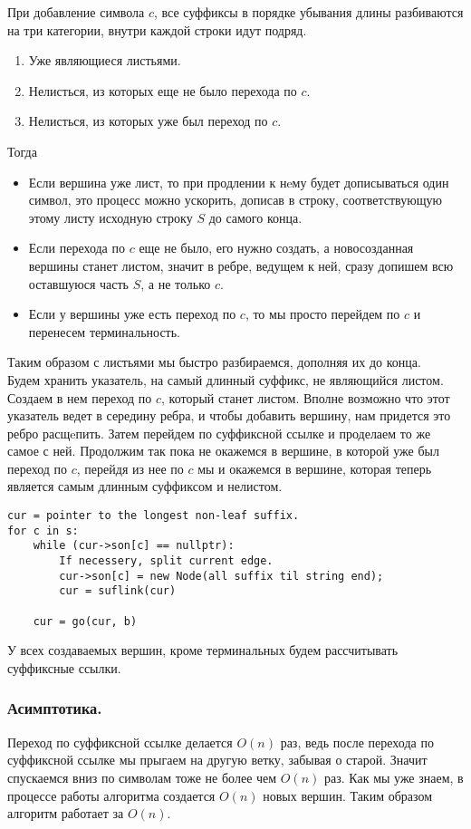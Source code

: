 При добавление символа $c$, все суффиксы в порядке убывания длины разбиваются на три категории, внутри каждой строки идут подряд. 
\begin{enumerate}
    \item Уже являющиеся листьями.
    \item Нелисться, из которых еще не было перехода по $c$.
    \item Нелисться, из которых уже был переход по $c$.
\end{enumerate}

Тогда 
\begin{itemize}
    \item Если вершина уже лист, то при продлении к нeму будет дописываться один символ, это процесс можно ускорить, дописав в строку, соответствующую этому листу исходную строку $S$ до самого конца. 
    \item Если перехода по $c$ еще не было, его нужно создать, а новосозданная вершины станет листом, значит в ребре, ведущем к ней, сразу допишем всю оставшуюся часть  $S$, а не только  $c$.
    \item Если у вершины уже есть переход по $c$, то мы просто перейдем по  $c$ и перенесем терминальность.
\end{itemize}

Таким образом с листьями мы быстро разбираемся, дополняя их до конца. \\
Будем хранить указатель, на самый длинный суффикс, не являющийся листом. Создаем в нем переход по $c$, который станет листом. Вполне возможно что этот указатель ведет в середину ребра, и чтобы добавить вершину, нам придется это ребро расщeпить. Затем перейдем по суффиксной ссылке и проделаем то же самое с ней. Продолжим так пока не окажемся в вершине, в которой уже был переход по $c$, перейдя из нее по $c$ мы и окажемся в вершине, которая теперь является самым длинным суффиксом и нелистом.

\begin{lstlisting}
cur = pointer to the longest non-leaf suffix.
for c in s:
    while (cur->son[c] == nullptr):
        If necessery, split current edge.
        cur->son[c] = new Node(all suffix til string end);
        cur = suflink(cur)

    cur = go(cur, b)
\end{lstlisting}

У всех создаваемых вершин, кроме терминальных будем рассчитывать суффиксные ссылки.
\subsubsection{Асимптотика.}
Переход по суффиксной ссылке делается $O(n)$ раз, ведь после перехода по суффиксной ссылке мы прыгаем на другую ветку, забывая о старой. Значит спускаемся вниз по символам тоже не более чем $O(n)$ раз.
Как мы уже знаем, в процессе работы алгоритма создается $O(n)$ новых вершин. 
Таким образом алгоритм работает за $O(n)$.

